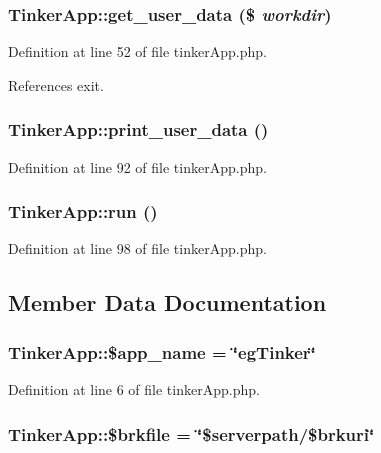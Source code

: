 \subsubsection{\setlength{\rightskip}{0pt plus 5cm}Tinker\-App::get\_\-user\_\-data (\$ {\em workdir})}\label{classTinkerApp_a0}




Definition at line 52 of file tinker\-App.php.

References exit.
\subsubsection{\setlength{\rightskip}{0pt plus 5cm}Tinker\-App::print\_\-user\_\-data ()}\label{classTinkerApp_a1}




Definition at line 92 of file tinker\-App.php.
\subsubsection{\setlength{\rightskip}{0pt plus 5cm}Tinker\-App::run ()}\label{classTinkerApp_a2}




Definition at line 98 of file tinker\-App.php.

\subsection{Member Data Documentation}
\subsubsection{\setlength{\rightskip}{0pt plus 5cm}Tinker\-App::\$app\_\-name = \char`\"{}eg\-Tinker\char`\"{}}\label{classTinkerApp_o0}




Definition at line 6 of file tinker\-App.php.
\subsubsection{\setlength{\rightskip}{0pt plus 5cm}Tinker\-App::\$brkfile = \char`\"{}\$serverpath/\$brkuri\char`\"{}}\label{classTinkerApp_o5}




